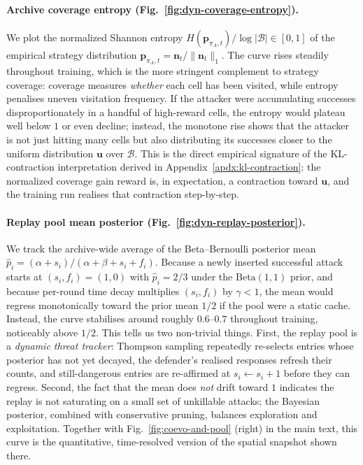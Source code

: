 \documentclass{article}
\newcommand{\piA}{\pi_A}
\newcommand{\strategyspace}{\mathcal{B}}
\begin{document}
\paragraph{Archive coverage entropy (Fig.~\ref{fig:dyn-coverage-entropy}).}
We plot the normalized Shannon entropy $H(\mathbf{p}_{\piA,t})/\log|\strategyspace|\in[0,1]$ of the empirical strategy distribution $\mathbf{p}_{\piA,t}=\mathbf{n}_t/\|\mathbf{n}_t\|_1$. The curve rises steadily throughout training, which is the more stringent complement to strategy coverage: coverage measures \emph{whether} each cell has been visited, while entropy penalises uneven visitation frequency. If the attacker were accumulating successes disproportionately in a handful of high-reward cells, the entropy would plateau well below $1$ or even decline; instead, the monotone rise shows that the attacker is not just hitting many cells but also distributing its successes closer to the uniform distribution $\mathbf{u}$ over $\strategyspace$. This is the direct empirical signature of the KL-contraction interpretation derived in Appendix~\ref{apdx:kl-contraction}: the normalized coverage gain reward is, in expectation, a contraction toward $\mathbf{u}$, and the training run realises that contraction step-by-step.

\paragraph{Replay pool mean posterior (Fig.~\ref{fig:dyn-replay-posterior}).}
We track the archive-wide average of the Beta--Bernoulli posterior mean $\hat p_i=(\alpha+s_i)/(\alpha+\beta+s_i+f_i)$. Because a newly inserted successful attack starts at $(s_i,f_i)=(1,0)$ with $\hat p_i=2/3$ under the $\mathrm{Beta}(1,1)$ prior, and because per-round time decay multiplies $(s_i,f_i)$ by $\gamma<1$, the mean would regress monotonically toward the prior mean $1/2$ if the pool were a static cache. Instead, the curve stabilises around roughly $0.6$--$0.7$ throughout training, noticeably above $1/2$. This tells us two non-trivial things. First, the replay pool is a \emph{dynamic threat tracker}: Thompson sampling repeatedly re-selects entries whose posterior has not yet decayed, the defender's realised responses refresh their counts, and still-dangerous entries are re-affirmed at $s_i\!\leftarrow\!s_i\!+\!1$ before they can regress. Second, the fact that the mean does \emph{not} drift toward $1$ indicates the replay is not saturating on a small set of unkillable attacks; the Bayesian posterior, combined with conservative pruning, balances exploration and exploitation. Together with Fig.~\ref{fig:coevo-and-pool} (right) in the main text, this curve is the quantitative, time-resolved version of the spatial snapshot shown there.
\end{document}
